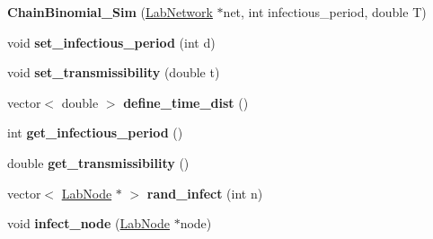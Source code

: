 \begin{DoxyCompactItemize}
\item 
\hypertarget{classstudy_1_1_chain_binomial___sim_ac9ce14a6ad8c59a0bae45e34e7e97d5b}{{\bfseries Chain\+Binomial\+\_\+\+Sim} (\hyperlink{classelps_1_1_lab_network}{Lab\+Network} $\ast$net, int infectious\+\_\+period, double T)}\label{classstudy_1_1_chain_binomial___sim_ac9ce14a6ad8c59a0bae45e34e7e97d5b}

\item 
\hypertarget{classstudy_1_1_chain_binomial___sim_aa0d269f91bdee8e059fe1282e3581c5f}{void {\bfseries set\+\_\+infectious\+\_\+period} (int d)}\label{classstudy_1_1_chain_binomial___sim_aa0d269f91bdee8e059fe1282e3581c5f}

\item 
\hypertarget{classstudy_1_1_chain_binomial___sim_a691e24c04b281f369c6273bde1330279}{void {\bfseries set\+\_\+transmissibility} (double t)}\label{classstudy_1_1_chain_binomial___sim_a691e24c04b281f369c6273bde1330279}

\item 
\hypertarget{classstudy_1_1_chain_binomial___sim_afb32ec4e3b3b02eb3e0a7aba7c82a914}{vector$<$ double $>$ {\bfseries define\+\_\+time\+\_\+dist} ()}\label{classstudy_1_1_chain_binomial___sim_afb32ec4e3b3b02eb3e0a7aba7c82a914}

\item 
\hypertarget{classstudy_1_1_chain_binomial___sim_ac527dfe4508fff86e3c43ceba819dabf}{int {\bfseries get\+\_\+infectious\+\_\+period} ()}\label{classstudy_1_1_chain_binomial___sim_ac527dfe4508fff86e3c43ceba819dabf}

\item 
\hypertarget{classstudy_1_1_chain_binomial___sim_a67902f96a6f7821d34930ff175068abe}{double {\bfseries get\+\_\+transmissibility} ()}\label{classstudy_1_1_chain_binomial___sim_a67902f96a6f7821d34930ff175068abe}

\item 
\hypertarget{classstudy_1_1_chain_binomial___sim_a2a60cd4ad9a101e19ab1a7d3a5cf8be8}{vector$<$ \hyperlink{classelps_1_1_lab_node}{Lab\+Node} $\ast$ $>$ {\bfseries rand\+\_\+infect} (int n)}\label{classstudy_1_1_chain_binomial___sim_a2a60cd4ad9a101e19ab1a7d3a5cf8be8}

\item 
\hypertarget{classstudy_1_1_chain_binomial___sim_af4910ce8861241756556165ffcc1ce92}{void {\bfseries infect\+\_\+node} (\hyperlink{classelps_1_1_lab_node}{Lab\+Node} $\ast$node)}\label{classstudy_1_1_chain_binomial___sim_af4910ce8861241756556165ffcc1ce92}


\end{DoxyCompactItemize}
